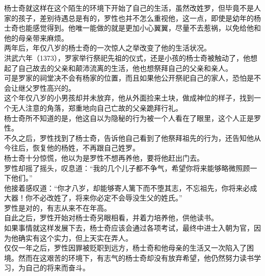 \begin{multicols}{\theparacolNo}
杨士奇就这样在这个陌生的环境下开始了自己的生活，虽然改姓罗，但毕竟不是人家的孩子，差别待遇总是有的，罗性也并不怎么重视他，这一点，即使是幼年的杨士奇也能感觉得到。他唯一能做的就是更加小心翼翼，尽量不去惹祸，以免给他和他的母亲带来麻烦。\\

两年后，年仅八岁的杨士奇的一次惊人之举改变了他的生活状况。\\

洪武六年（1373），罗家举行祭祀先祖的仪式，还是小孩的杨士奇被触动了，他想起了自己故去的父亲和颠沛流离的生活，他也想祭拜自己的父亲和亲人。\\

可是罗家的祠堂决不会有杨家的位置，而且如果他公开祭祀自己的家人，恐怕是不会让继父罗性高兴的。\\

这个年仅八岁的小男孩却并未放弃，他从外面捡来土块，做成神位的样子，找到一个无人注意的角落，郑重地向自己亡故的父亲跪拜行礼。\\

杨士奇所不知道的是，他这自以为隐秘的行为被一个人看在了眼里，这个人正是罗性。\\

不久之后，罗性找到了杨士奇，告诉他自己看到了他祭拜祖先的行为，还告知他从今往后，恢复他的杨姓，不再跟自己姓罗。\\

杨士奇十分惊慌，他以为是罗性不想再养他，要将他赶出门去。\\

罗性却摇了摇头，叹息道：“我的几个儿子都不争气，希望你将来能够略微照顾一下他们。”\\

他接着感叹道：“你才八岁，却能够寄人篱下而不堕其志，不忘祖先，你将来必成大器！你不必改姓了，将来你必定不会辱没生父的姓氏。”\\

罗性是对的，有志从来不在年高。\\

自此之后，罗性开始对杨士奇另眼相看，并着力培养他，供他读书。\\

如果事情就这样发展下去，杨士奇应该会通过各项考试，最终中进士入朝为官，因为他确实有这个实力，但上天实在弄人。\\

仅仅一年之后，罗性因罪被贬职到远方，杨士奇和他母亲的生活又一次陷入了困境。然而在这艰苦的环境下，有志气的杨士奇却没有放弃希望，他仍然努力读书学习，为自己的将来而奋斗。\\


\end{multicols}
